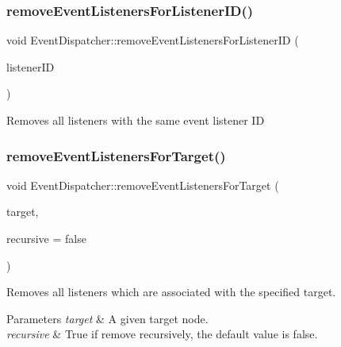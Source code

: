 \subsubsection{\texorpdfstring{remove\+Event\+Listeners\+For\+Listener\+I\+D()}{removeEventListenersForListenerID()}\hspace{0.1cm}{\footnotesize\ttfamily [2/2]}}
{\footnotesize\ttfamily void Event\+Dispatcher\+::remove\+Event\+Listeners\+For\+Listener\+ID (\begin{DoxyParamCaption}\item[{const Event\+Listener\+::\+Listener\+ID \&}]{listener\+ID }\end{DoxyParamCaption})\hspace{0.3cm}{\ttfamily [protected]}}

Removes all listeners with the same event listener ID \mbox{\label{classEventDispatcher_a64446315eca1c938c541d35d35d1a2a4}} 
\subsubsection{\texorpdfstring{remove\+Event\+Listeners\+For\+Target()}{removeEventListenersForTarget()}\hspace{0.1cm}{\footnotesize\ttfamily [1/2]}}
{\footnotesize\ttfamily void Event\+Dispatcher\+::remove\+Event\+Listeners\+For\+Target (\begin{DoxyParamCaption}\item[{\hyperlink{classNode}{Node} $\ast$}]{target,  }\item[{bool}]{recursive = {\ttfamily false} }\end{DoxyParamCaption})}

Removes all listeners which are associated with the specified target.


\begin{DoxyParams}{Parameters}
{\em target} & A given target node. \\
\hline
{\em recursive} & True if remove recursively, the default value is false. \\
\hline
\end{DoxyParams}
\mbox{\label{classEventDispatcher_a64446315eca1c938c541d35d35d1a2a4}} 

